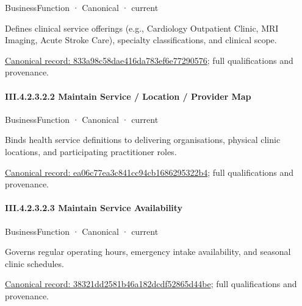 \label{element:833a98c58dae416da783ef6e77290576}
{\small BusinessFunction · Canonical · current}\par

Defines clinical service offerings (e.g., Cardiology Outpatient Clinic, MRI Imaging, Acute Stroke Care), specialty classifications, and clinical scope.


{\footnotesize \href{../../../../continuum/business/business-function/833a98c58dae416da783ef6e77290576.md}{Canonical record: 833a98c58dae416da783ef6e77290576}; full qualifications and provenance.}\par
\paragraph*{III.4.2.3.2.2 Maintain Service / Location / Provider Map}
\label{navigation:III.4.2.3.2.2}

\label{element:ea06c77ea3c841cc94cb1686295322b4}
{\small BusinessFunction · Canonical · current}\par

Binds health service definitions to delivering organisations, physical clinic locations, and participating practitioner roles.


{\footnotesize \href{../../../../continuum/business/business-function/ea06c77ea3c841cc94cb1686295322b4.md}{Canonical record: ea06c77ea3c841cc94cb1686295322b4}; full qualifications and provenance.}\par
\paragraph*{III.4.2.3.2.3 Maintain Service Availability}
\label{navigation:III.4.2.3.2.3}

\label{element:38321dd2581b46a182dcdf52865d44be}
{\small BusinessFunction · Canonical · current}\par

Governs regular operating hours, emergency intake availability, and seasonal clinic schedules.


{\footnotesize \href{../../../../continuum/business/business-function/38321dd2581b46a182dcdf52865d44be.md}{Canonical record: 38321dd2581b46a182dcdf52865d44be}; full qualifications and provenance.}\par
